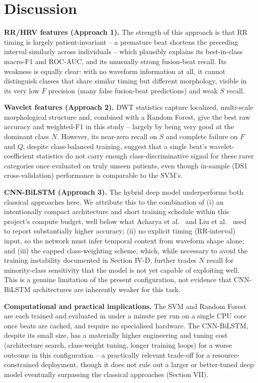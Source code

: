 \documentclass[conference]{IEEEtran}
\begin{document}
\section{Discussion}

\textbf{RR/HRV features (Approach 1).} The strength of this approach is
that RR timing is largely patient-invariant -- a premature beat shortens
the preceding interval similarly across individuals -- which plausibly
explains its best-in-class macro-F1 and ROC-AUC, and its unusually strong
fusion-beat recall. Its weakness is equally clear: with no waveform
information at all, it cannot distinguish classes that share similar
timing but different morphology, visible in its very low $F$ precision
(many false fusion-beat predictions) and weak $S$ recall.

\textbf{Wavelet features (Approach 2).} DWT statistics capture
localized, multi-scale morphological structure and, combined with a
Random Forest, give the best raw accuracy and weighted-F1 in this study
-- largely by being very good at the dominant class $N$. However, its
near-zero recall on $S$ and complete failure on $F$ and $Q$, despite
class-balanced training, suggest that a single beat's wavelet-coefficient
statistics do not carry enough class-discriminative signal for these
rarer categories once evaluated on truly unseen patients, even though
in-sample (DS1 cross-validation) performance is comparable to the SVM's.

\textbf{CNN-BiLSTM (Approach 3).} The hybrid deep model underperforms
both classical approaches here. We attribute this to the combination of
(i) an intentionally compact architecture and short training schedule
within this project's compute budget, well below what
Acharya et al.~\cite{acharya2017deep} and
Liu et al.~\cite{liu2019attention} used to report substantially higher
accuracy; (ii) no explicit timing (RR-interval) input, so the network
must infer temporal context from waveform shape alone; and (iii) the
capped class-weighting scheme, which, while necessary to avoid the
training instability documented in Section IV-D, further trades $N$
recall for minority-class sensitivity that the model is not yet capable
of exploiting well. This is a genuine limitation of the present
configuration, not evidence that CNN-BiLSTM architectures are
inherently weaker for this task.

\textbf{Computational and practical implications.} The SVM and Random
Forest are each trained and evaluated in under a minute per run on a
single CPU core once beats are cached, and require no specialised
hardware. The CNN-BiLSTM, despite its small size, has a materially higher
engineering and tuning cost (architecture search, class-weight tuning,
longer training loops) for a worse outcome in this configuration --
a practically relevant trade-off for a resource-constrained deployment,
though it does not rule out a larger or better-tuned deep model
eventually surpassing the classical approaches (Section VII).
\end{document}
